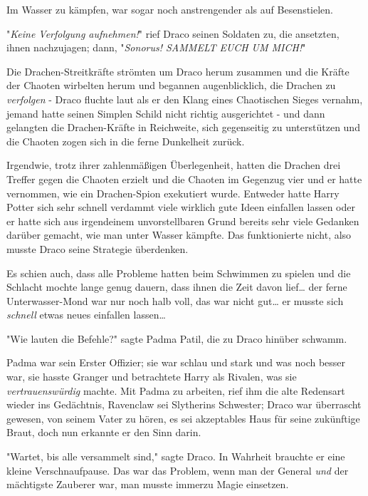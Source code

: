 {Im Wasser zu kämpfen, war sogar noch anstrengender als auf Besenstielen.

"\emph{Keine Verfolgung aufnehmen!}" rief Draco seinen Soldaten zu, die ansetzten, ihnen nachzujagen; dann, "\emph{Sonorus! SAMMELT EUCH UM MICH!}"

Die Drachen-Streitkräfte strömten um Draco herum zusammen und die Kräfte der Chaoten wirbelten herum und begannen augenblicklich, die Drachen zu \emph{verfolgen} - Draco fluchte laut als er den Klang eines Chaotischen Sieges vernahm, jemand hatte seinen Simplen Schild nicht richtig ausgerichtet - und dann gelangten die Drachen-Kräfte in Reichweite, sich gegenseitig zu unterstützen und die Chaoten zogen sich in die ferne Dunkelheit zurück.

Irgendwie, trotz ihrer zahlenmäßigen Überlegenheit, hatten die Drachen drei Treffer gegen die Chaoten erzielt und die Chaoten im Gegenzug vier und er hatte vernommen, wie ein Drachen-Spion exekutiert wurde. Entweder hatte Harry Potter sich sehr schnell verdammt viele wirklich gute Ideen einfallen lassen oder er hatte sich aus irgendeinem unvorstellbaren Grund bereits sehr viele Gedanken darüber gemacht, wie man unter Wasser kämpfte. Das funktionierte nicht, also musste Draco seine Strategie überdenken.

Es schien auch, dass alle Probleme hatten beim Schwimmen zu spielen und die Schlacht mochte lange genug dauern, dass ihnen die Zeit davon lief… der ferne Unterwasser-Mond war nur noch halb voll, das war nicht gut… er musste sich \emph{schnell} etwas neues einfallen lassen…

"Wie lauten die Befehle?" sagte Padma Patil, die zu Draco hinüber schwamm.

Padma war sein Erster Offizier; sie war schlau und stark und was noch besser war, sie hasste Granger und betrachtete Harry als Rivalen, was sie \emph{vertrauenswürdig} machte. Mit Padma zu arbeiten, rief ihm die alte Redensart wieder ins Gedächtnis, Ravenclaw sei Slytherins Schwester; Draco war überrascht gewesen, von seinem Vater zu hören, es sei akzeptables Haus für seine zukünftige Braut, doch nun erkannte er den Sinn darin.

"Wartet, bis alle versammelt sind," sagte Draco. In Wahrheit brauchte er eine kleine Verschnaufpause. Das war das Problem, wenn man der General \emph{und} der mächtigste Zauberer war, man musste immerzu Magie einsetzen.

}

